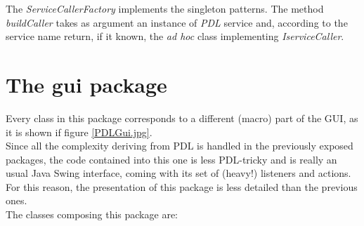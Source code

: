 \documentclass[a4paper,11pt] {ivoa}
\begin{document}
\noindent The {\it ServiceCallerFactory} implements the singleton patterns. The method {\it buildCaller} takes as argument an instance of {\it PDL} service and, according to the service name return, if it known, the {\it ad hoc} class implementing {\it IserviceCaller}.

\section{The gui package}
\noindent Every class in this package corresponds to a different (macro) part of the GUI, as it is shown if figure \ref{PDLGui.jpg}. \\
\noindent Since all the complexity deriving from PDL is handled in the previously exposed packages, the code contained into this one is less PDL-tricky and is really an usual Java Swing interface, coming with its set of (heavy!) listeners and actions. For this reason, the presentation of this package is less detailed than the previous ones.\\
The classes composing this package are:
\end{document}
